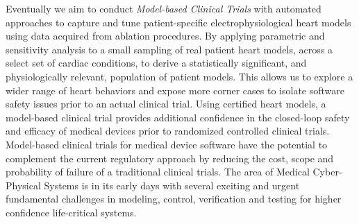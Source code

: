 Eventually we aim to conduct \emph{Model-based Clinical Trials} with automated approaches to capture and tune patient-specific electrophysiological heart models using data acquired from ablation procedures. By applying parametric and sensitivity analysis to a small sampling of real patient heart models, across a select set of cardiac conditions, to derive a statistically significant, and physiologically relevant, population of patient models. This allows us to explore a wider range of heart behaviors and expose more corner cases to isolate software safety issues prior to an actual clinical trial. Using certified heart models, a model-based clinical trial provides additional confidence in the closed-loop safety and efficacy of medical devices prior to randomized controlled clinical trials. Model-based clinical trials for medical device software have the potential to complement the current regulatory approach by reducing the cost, scope and probability of failure of a traditional clinical trials. The area of Medical Cyber-Physical Systems is in its early days with several exciting and urgent fundamental challenges in modeling, control, verification and testing for higher confidence life-critical systems.

